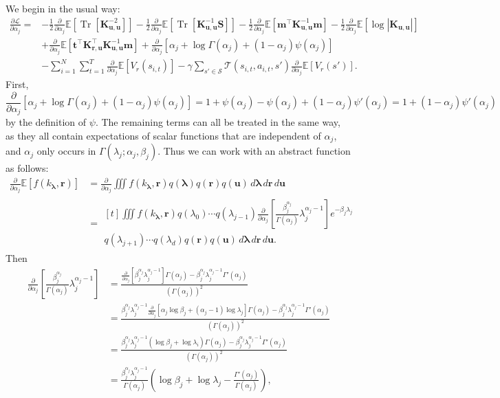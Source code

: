 \documentclass{article}
\theoremstyle{definition}
\DeclareMathOperator{\Tr}{Tr}
\newcommand{\Kuu}{\mathbf{K}_{\mathbf{u},\mathbf{u}}}
\newcommand{\Kru}{\mathbf{K}_{\mathbf{r},\mathbf{u}}}
\newcommand{\da}{\frac{\partial}{\partial\alpha_j}}
\begin{document}
We begin in the usual way:
\[
  \begin{split}
    \frac{\partial\mathcal{L}}{\partial\alpha_j} = &-
    \frac{1}{2}\da\mathbb{E}[\Tr[\Kuu^{-2}]] - \frac{1}{2}\da\mathbb{E}[\Tr[\Kuu^{-1}\mathbf{S}]] - \frac{1}{2}\da\mathbb{E}[\mathbf{m}^\intercal\Kuu^{-1}\mathbf{m}] - \frac{1}{2}\da\mathbb{E}[\log|\Kuu|] \\
    &+ \da\mathbb{E}[\mathbf{t}^\intercal\Kru^\intercal\Kuu^{-1}\mathbf{m}] +
    \da [\alpha_j + \log\Gamma(\alpha_j) + (1 - \alpha_j)\psi(\alpha_j)] \\
      &- \sum_{i=1}^N \sum_{t=1}^T \da\mathbb{E}[V_r(s_{i,t})] -
        \gamma\sum_{s' \in \mathcal{S}} \mathcal{T}(s_{i,t}, a_{i,t},
        s')\da\mathbb{E}[V_r(s')].
  \end{split}
\]
First,
\[ \da [\alpha_j + \log\Gamma(\alpha_j) + (1 - \alpha_j)\psi(\alpha_j)] = 1 +
  \psi(\alpha_j) - \psi(\alpha_j) + (1 - \alpha_j)\psi'(\alpha_j) = 1 + (1 -
  \alpha_j)\psi'(\alpha_j) \]
by the definition of $\psi$. The remaining terms can all be treated in the same
way, as they all contain expectations of scalar functions that are independent
of $\alpha_j$, and $\alpha_j$ only occurs in $\Gamma(\lambda_j; \alpha_j,
\beta_j)$. Thus we can work with an abstract function as follows:
\[
  \begin{split}
    \da\mathbb{E}[f(k_{\bm\lambda}, \mathbf{r})] &= \da \iiint f(k_{\bm\lambda},
    \mathbf{r}) q(\bm\lambda) q(\mathbf{r})
    q(\mathbf{u})\,d\bm\lambda\,d\mathbf{r}\,d\mathbf{u} \\
    &= \!\begin{multlined}[t]
      \iiint f(k_{\bm\lambda}, \mathbf{r}) q(\lambda_0) \cdots q(\lambda_{j-1}) \da
      \left[ \frac{\beta_j^{\alpha_j}}{\Gamma(\alpha_j)} \lambda_j^{\alpha_j -
          1} \right] e^{-\beta_j\lambda_j} \\
      q(\lambda_{j+1}) \cdots q(\lambda_d) q(\mathbf{r})
      q(\mathbf{u})\,d\bm\lambda\,d\mathbf{r}\,d\mathbf{u}.
    \end{multlined}
  \end{split}
\]
Then
\[
  \begin{split}
    \da \left[ \frac{\beta_j^{\alpha_j}}{\Gamma(\alpha_j)} \lambda_j^{\alpha_j - 1} \right] &=
    \frac{\da[\beta_j^{\alpha_j}\lambda_j^{\alpha_j - 1}]\Gamma(\alpha_j) -
      \beta_j^{\alpha_j}\lambda_j^{\alpha_j - 1}\Gamma'(\alpha_j)}{(\Gamma(\alpha_j))^2} \\
    &= \frac{\beta_j^{\alpha_j}\lambda_j^{\alpha_j - 1}\da[\alpha_j\log\beta_j + (\alpha_j -
      1)\log\lambda_j]\Gamma(\alpha_j) - \beta_j^{\alpha_j}\lambda_j^{\alpha_j -
        1}\Gamma'(\alpha_j)}{(\Gamma(\alpha_j))^2} \\
    &= \frac{\beta_j^{\alpha_j}\lambda_j^{\alpha_j - 1}(\log\beta_j + \log\lambda_i)\Gamma(\alpha_j)
      - \beta_j^{\alpha_j}\lambda_j^{\alpha_j - 1}\Gamma'(\alpha_j)}{(\Gamma(\alpha_j))^2} \\
    &= \frac{\beta_j^{\alpha_j}\lambda_j^{\alpha_j - 1}}{\Gamma(\alpha_j)}\left(\log\beta_j +
    \log\lambda_j - \frac{\Gamma'(\alpha_j)}{\Gamma(\alpha_j)}\right),
  \end{split}
\]
\end{document}
